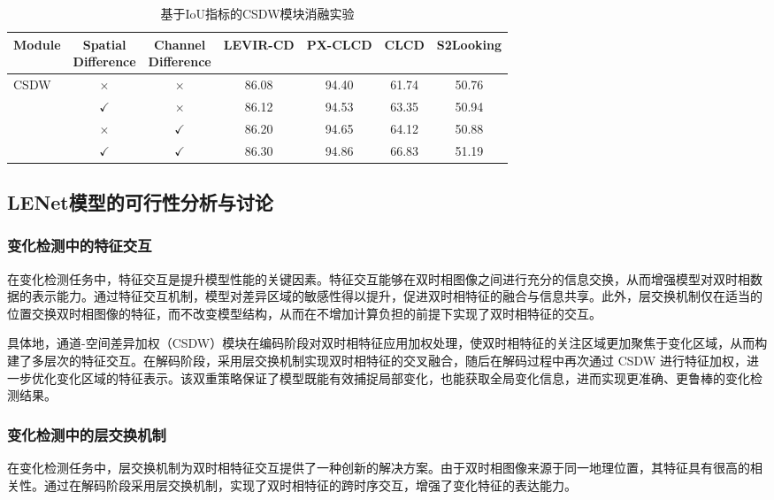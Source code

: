 \begin{table}[!htb]
  \centering
  \caption{基于IoU指标的CSDW模块消融实验}
  \label{tab:lenet_ablation_csdw}
  \begin{tabular}{lcccccc}
    \toprule
    Module 
      & \makecell{Spatial\\Difference} 
      & \makecell{Channel\\Difference} 
      & LEVIR-CD 
      & PX-CLCD 
      & CLCD  
      & S2Looking \\
    \midrule
    \multirow{4}{*}{CSDW} 
                       & $\times$      & $\times$      & 86.08    & 94.40   & 61.74 & 50.76     \\
                       & $\checkmark$  & $\times$      & 86.12    & 94.53   & 63.35 & 50.94     \\
                       & $\times$      & $\checkmark$  & 86.20    & 94.65   & 64.12 & 50.88     \\
                       & $\checkmark$  & $\checkmark$  & 86.30    & 94.86   & 66.83 & 51.19     \\
    \bottomrule
  \end{tabular}
\end{table}



\subsection{LENet模型的可行性分析与讨论}

\subsubsection{变化检测中的特征交互}
在变化检测任务中，特征交互是提升模型性能的关键因素。特征交互能够在双时相图像之间进行充分的信息交换，从而增强模型对双时相数据的表示能力。通过特征交互机制，模型对差异区域的敏感性得以提升，促进双时相特征的融合与信息共享。此外，层交换机制仅在适当的位置交换双时相图像的特征，而不改变模型结构，从而在不增加计算负担的前提下实现了双时相特征的交互。

具体地，通道-空间差异加权（CSDW）模块在编码阶段对双时相特征应用加权处理，使双时相特征的关注区域更加聚焦于变化区域，从而构建了多层次的特征交互。在解码阶段，采用层交换机制实现双时相特征的交叉融合，随后在解码过程中再次通过 CSDW 进行特征加权，进一步优化变化区域的特征表示。该双重策略保证了模型既能有效捕捉局部变化，也能获取全局变化信息，进而实现更准确、更鲁棒的变化检测结果。

\subsubsection{变化检测中的层交换机制}
在变化检测任务中，层交换机制为双时相特征交互提供了一种创新的解决方案。由于双时相图像来源于同一地理位置，其特征具有很高的相关性。通过在解码阶段采用层交换机制，实现了双时相特征的跨时序交互，增强了变化特征的表达能力。

